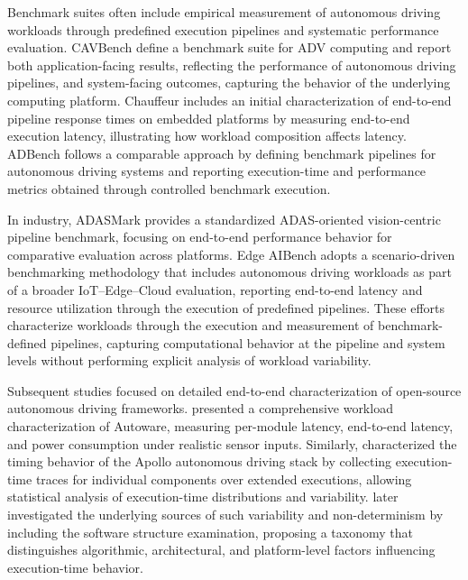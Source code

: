 Benchmark suites often include empirical measurement of autonomous driving workloads through predefined execution pipelines and systematic performance evaluation. CAVBench \cite{wang2018} define a benchmark suite for ADV computing and report both application-facing results, reflecting the performance of autonomous driving pipelines, and system-facing outcomes, capturing the behavior of the underlying computing platform. Chauffeur \cite{Maity2021Chauffeur:Systems} includes an initial characterization of end-to-end pipeline response times on embedded platforms by measuring end-to-end execution latency, illustrating how workload composition affects latency. ADBench \cite{Tabani2022ADBench:Systems} follows a comparable approach by defining benchmark pipelines for autonomous driving systems and reporting execution-time and performance metrics obtained through controlled benchmark execution.

In industry, ADASMark \cite{EEMBC2019ADASMark} provides a standardized ADAS-oriented vision-centric pipeline benchmark, focusing on end-to-end performance behavior for comparative evaluation across platforms.  Edge AIBench \cite{Hao2022EdgeSystems} adopts a scenario-driven benchmarking methodology that includes autonomous driving workloads as part of a broader IoT–Edge–Cloud evaluation, reporting end-to-end latency and resource utilization through the execution of predefined pipelines. These efforts characterize workloads through the execution and measurement of benchmark-defined pipelines, capturing computational behavior at the pipeline and system levels without performing explicit analysis of workload variability.

Subsequent studies focused on detailed end-to-end characterization of open-source autonomous driving frameworks.  presented a comprehensive workload characterization of Autoware, measuring per-module latency, end-to-end latency, and power consumption under realistic sensor inputs. %
Similarly,  characterized the timing behavior of the Apollo autonomous driving stack by collecting execution-time traces for individual components over extended executions, allowing statistical analysis of execution-time distributions and variability. %
 later investigated the underlying sources of such variability and non-determinism by including the software structure examination, proposing a taxonomy that distinguishes algorithmic, architectural, and platform-level factors influencing execution-time behavior. %



